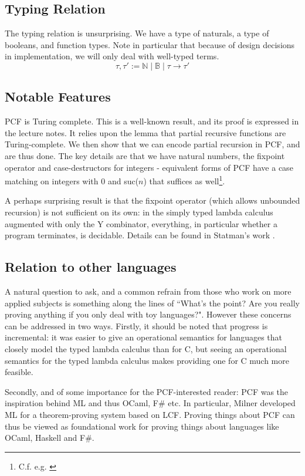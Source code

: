 \documentclass[12pt,a4paper,twoside,openright]{report}
\begin{document}
\subsection{Typing Relation}
The typing relation is unsurprising. We have a type of naturals, a type of booleans, and function types. Note in particular that because of design decisions in implementation, we will only deal with well-typed terms.
\[
\tau, \tau' := \mathbb{N} \mid \mathbb{B} \mid \tau \to \tau'
\]
\subsection{Notable Features}
PCF is Turing complete. This is a well-known result, and its proof is expressed in the lecture notes. It relies upon the lemma that partial recursive functions are Turing-complete. We then show that we can encode partial recursion in PCF, and are thus done. The key details are that we have natural numbers, the fixpoint operator and case-destructors for integers - equivalent forms of PCF have a case matching on integers with $0$ and suc($n$) that suffices as well\footnote{C.f. e.g. \cite{PLFA}}. 

A perhaps surprising result is that the fixpoint operator (which allows unbounded recursion) is not sufficient on its own: in the simply typed lambda calculus augmented with only the Y combinator, everything, in particular whether a program terminates, is decidable. Details can be found in Statman's work \cite{Statman}. 
\subsection{Relation to other languages}
A natural question to ask, and a common refrain from those who work on more applied subjects is something along the lines of ``What's the point? Are you really proving anything if you only deal with toy languages?". However these concerns can be addressed in two ways. Firstly, it should be noted that progress is incremental: it was easier to give an operational semantics for languages that closely model the typed lambda calculus than for C, but seeing an operational semantics for the typed lambda calculus makes providing one for C much more feasible. 

Secondly, and of some importance for the PCF-interested reader: PCF was the inspiration behind ML and thus OCaml, F\# etc. In particular, Milner developed ML for a theorem-proving system based on LCF. Proving things about PCF can thus be viewed as foundational work for proving things about languages like OCaml, Haskell and F\#.
\end{document}
